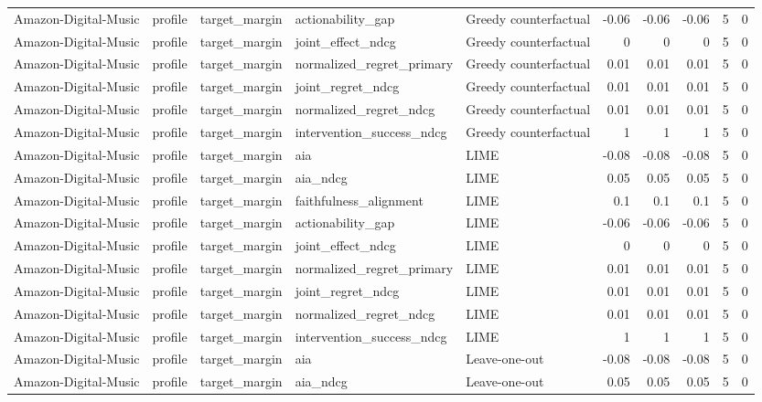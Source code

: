 \begin{table}[t]
{\begin{tabular}{lllllrrrrr}
Amazon-Digital-Music & profile & target\_margin & actionability\_gap & Greedy counterfactual & -0.06 & -0.06 & -0.06 & 5 & 0 \\
Amazon-Digital-Music & profile & target\_margin & joint\_effect\_ndcg & Greedy counterfactual & 0 & 0 & 0 & 5 & 0 \\
Amazon-Digital-Music & profile & target\_margin & normalized\_regret\_primary & Greedy counterfactual & 0.01 & 0.01 & 0.01 & 5 & 0 \\
Amazon-Digital-Music & profile & target\_margin & joint\_regret\_ndcg & Greedy counterfactual & 0.01 & 0.01 & 0.01 & 5 & 0 \\
Amazon-Digital-Music & profile & target\_margin & normalized\_regret\_ndcg & Greedy counterfactual & 0.01 & 0.01 & 0.01 & 5 & 0 \\
Amazon-Digital-Music & profile & target\_margin & intervention\_success\_ndcg & Greedy counterfactual & 1 & 1 & 1 & 5 & 0 \\
Amazon-Digital-Music & profile & target\_margin & aia & LIME & -0.08 & -0.08 & -0.08 & 5 & 0 \\
Amazon-Digital-Music & profile & target\_margin & aia\_ndcg & LIME & 0.05 & 0.05 & 0.05 & 5 & 0 \\
Amazon-Digital-Music & profile & target\_margin & faithfulness\_alignment & LIME & 0.1 & 0.1 & 0.1 & 5 & 0 \\
Amazon-Digital-Music & profile & target\_margin & actionability\_gap & LIME & -0.06 & -0.06 & -0.06 & 5 & 0 \\
Amazon-Digital-Music & profile & target\_margin & joint\_effect\_ndcg & LIME & 0 & 0 & 0 & 5 & 0 \\
Amazon-Digital-Music & profile & target\_margin & normalized\_regret\_primary & LIME & 0.01 & 0.01 & 0.01 & 5 & 0 \\
Amazon-Digital-Music & profile & target\_margin & joint\_regret\_ndcg & LIME & 0.01 & 0.01 & 0.01 & 5 & 0 \\
Amazon-Digital-Music & profile & target\_margin & normalized\_regret\_ndcg & LIME & 0.01 & 0.01 & 0.01 & 5 & 0 \\
Amazon-Digital-Music & profile & target\_margin & intervention\_success\_ndcg & LIME & 1 & 1 & 1 & 5 & 0 \\
Amazon-Digital-Music & profile & target\_margin & aia & Leave-one-out & -0.08 & -0.08 & -0.08 & 5 & 0 \\
Amazon-Digital-Music & profile & target\_margin & aia\_ndcg & Leave-one-out & 0.05 & 0.05 & 0.05 & 5 & 0 \\

\end{tabular}}
\end{table}
